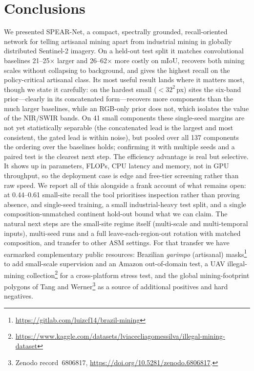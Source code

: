 \documentclass[review]{elsarticle}
\begin{document}
\section{Conclusions}\label{sec:conclusion}
We presented SPEAR-Net, a compact, spectrally grounded, recall-oriented network for telling
artisanal mining apart from industrial mining in globally distributed Sentinel-2 imagery. On
a held-out test split it matches convolutional baselines \num{21}--\num{25}$\times$ larger
and \num{26}--\num{62}$\times$ more costly on mIoU, recovers both mining scales without
collapsing to background, and gives the highest recall on the policy-critical artisanal
class. Its most useful result lands where it matters most, though we state it carefully: on
the hardest small ($<32^2$\,px) sites the six-band prior---clearly in its concatenated
form---recovers more components than the much larger baselines, while an RGB-only prior does
not, which isolates the value of the NIR/SWIR bands. On \num{41} small components these
single-seed margins are not yet statistically separable (the concatenated lead is the largest
and most consistent, the gated lead is within noise), but pooled over all \num{137} components
the ordering over the baselines holds; confirming it with multiple seeds and a paired test is
the clearest next step. The
efficiency advantage is real but selective. It shows up in parameters, FLOPs, CPU latency
and memory, not in GPU throughput, so the deployment case is edge and free-tier screening
rather than raw speed. We report all of this alongside a frank account of what remains open:
at \num{0.44}--\num{0.61} small-site recall the tool prioritises inspection rather than
proving absence, and single-seed training, a small industrial-heavy test split, and a single
composition-unmatched continent hold-out bound what we can claim. The natural next steps are
the small-site regime itself (multi-scale and multi-temporal inputs), multi-seed runs and a
full leave-each-region-out rotation with matched composition, and transfer to other ASM
settings. For that transfer we have earmarked complementary public
resources: Brazilian \emph{garimpo} (artisanal) masks\footnote{\url{https://gitlab.com/luizcf14/brazil-mining}}
to add small-scale supervision and an Amazon out-of-domain test, a UAV illegal-mining
collection\footnote{\url{https://www.kaggle.com/datasets/lviacecliagomessilva/illegal-mining-dataset}}
for a cross-platform stress test, and the global mining-footprint polygons of Tang and
Werner\footnote{Zenodo record~6806817, \url{https://doi.org/10.5281/zenodo.6806817}.}
\cite{tang2023mining} as a source of additional positives and hard negatives.
\end{document}
